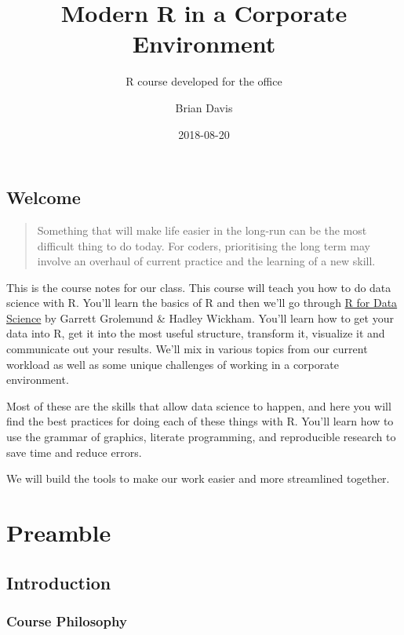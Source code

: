 \documentclass[]{book}
\title{Modern R in a Corporate Environment}
\subtitle{R course developed for the office}
\author{Brian Davis}
\date{2018-08-20}
\theoremstyle{definition}
\theoremstyle{definition}
\theoremstyle{definition}
\theoremstyle{remark}
\begin{document}
\maketitle

{
\setcounter{tocdepth}{1}
\tableofcontents
}
\chapter*{Welcome}\label{welcome}

\begin{quote}
Something that will make life easier in the long-run can be the most
difficult thing to do today. For coders, prioritising the long term may
involve an overhaul of current practice and the learning of a new skill.
\end{quote}

This is the course notes for our class. This course will teach you how
to do data science with R. You'll learn the basics of R and then we'll
go through \href{http://r4ds.had.co.nz/index.html}{R for Data Science}
by Garrett Grolemund \& Hadley Wickham. You'll learn how to get your
data into R, get it into the most useful structure, transform it,
visualize it and communicate out your results. We'll mix in various
topics from our current workload as well as some unique challenges of
working in a corporate environment.

Most of these are the skills that allow data science to happen, and here
you will find the best practices for doing each of these things with R.
You'll learn how to use the grammar of graphics, literate programming,
and reproducible research to save time and reduce errors.

We will build the tools to make our work easier and more streamlined
together.

\part{Preamble}\label{part-preamble}

\chapter{Introduction}\label{preamble-intro}

\section{Course Philosophy}\label{course-philosophy}
\end{document}
